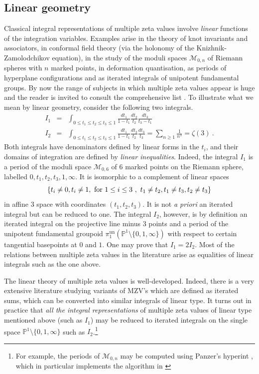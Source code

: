 \documentclass[12pt]{amsart}
\newcommand{\PP}{{\mathbb P}}
\theoremstyle{plain}
\newcommand{\0}{\color{blue}{\mathsf{0}}}
\begin{document}
\subsection{Linear geometry}
Classical integral representations of multiple zeta values involve \emph{linear} functions of the integration variables. 
Examples  arise in the theory of knot invariants and associators, in conformal field theory (via the holonomy of the Knizhnik-Zamolodchikov equation), in the study of the moduli spaces $\mathcal{M}_{0,n}$ of Riemann spheres with $n$ marked points, in deformation quantisation, as periods of hyperplane configurations and as iterated integrals of unipotent fundamental groups.    By now the range of subjects in which multiple zeta values appear is huge and the reader is invited to consult the comprehensive list \cite{HoffmanHomePage}. 
To illustrate what we mean by linear geometry,  consider the following  two  integrals.
\begin{eqnarray} 
I_1 & =& \int_{0\leq t_1 \leq t_2 \leq t_3 \leq 1}  \frac{dt_1}{1-t_1 }\frac{dt_2}{t_2} \frac{dt_3}{t_3-t_1}  \\
I_2 & = &  \int_{0\leq t_1 \leq t_2 \leq t_3 \leq 1}  \frac{dt_1}{1-t_1 }\frac{dt_2}{t_2} \frac{dt_3}{t_3}  = \sum_{n\geq 1}  \frac{1}{n^3} = \zeta(3)  \ .   
\end{eqnarray}
Both integrals have denominators  defined by linear forms in the $t_i$, and their domains of integration are defined by  \emph{linear inequalities}. 
Indeed, the integral $I_1$ is a period  of the moduli space $\mathcal{M}_{0,6}$ of 6 marked points on the Riemann sphere, labelled $0,t_1,t_2,t_3,1,\infty$. It is isomorphic to  a complement of  linear spaces 
\[ \{ t_i\neq 0, t_i\neq 1, \hbox{ for } 1\leq i \leq 3 \ , \       t_1 \neq t_2, t_1 \neq t_3, t_2\neq t_3\}   \]
in affine $3$ space with coordinates   $(t_1,t_2,t_3)$.  It is not \emph{a priori} an iterated integral but can be reduced to one. 
The integral $I_2$, however,  is  by definition an iterated integral on the projective line minus 3 points and a period of the unipotent fundamental groupoid $\pi_1^{\mathrm{un}}(\PP^1 \setminus \{0,1,\infty\})$ with respect to certain tangential basepoints at $0$ and $1$. 
One may prove  that $I_1 = 2I_2$. 
Most of the relations between multiple zeta values in the literature arise as equalities of linear integrals such as the one  above. 

The linear theory of multiple zeta values is well-developed. Indeed,  there is a very extensive literature studying variants of MZV's which are defined as iterated sums, which can  be converted into similar integrals of linear type.  It turns out in practice that  \emph{all the integral representations}  of multiple zeta values  of linear type mentioned above (such as $I_1$) may be reduced to iterated integrals on  the single space $\PP^1 \setminus \{0,1,\infty\}$ such as $I_2$.\footnote{For example, the  periods of $\mathcal{M}_{0,n}$ may be computed  using Panzer's hyperint \cite{Panzer}, which in particular implements the algorithm in \cite{BrENS}} 
\end{document}
